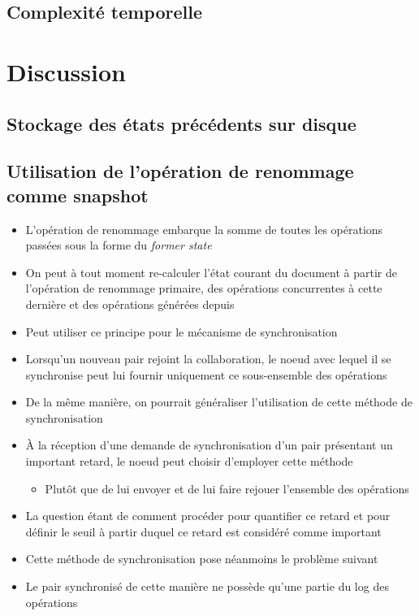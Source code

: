 \documentclass[12pt]{thesul}
\begin{document}
\subsection{Complexité temporelle}
\section{Discussion}
\subsection{Stockage des états précédents sur disque}
\subsection{Utilisation de l'opération de renommage comme snapshot}

\begin{itemize}
  \item L'opération de renommage embarque la somme de toutes les opérations passées sous la forme du \emph{former state}
  \item On peut à tout moment re-calculer l'état courant du document à partir de l'opération de renommage primaire, des opérations concurrentes à cette dernière et des opérations générées depuis
  \item Peut utiliser ce principe pour le mécanisme de synchronisation
  \item Lorsqu'un nouveau pair rejoint la collaboration, le noeud avec lequel il se synchronise peut lui fournir uniquement ce sous-ensemble des opérations
  \item De la même manière, on pourrait généraliser l'utilisation de cette méthode de synchronisation
  \item À la réception d'une demande de synchronisation d'un pair présentant un important retard, le noeud peut choisir d'employer cette méthode
  \begin{itemize}
    \item Plutôt que de lui envoyer et de lui faire rejouer l'ensemble des opérations
  \end{itemize}
  \item La question étant de comment procéder pour quantifier ce retard et pour définir le seuil à partir duquel ce retard est considéré comme important
  \item Cette méthode de synchronisation pose néanmoins le problème suivant
  \item Le pair synchronisé de cette manière ne possède qu'une partie du log des opérations

\end{itemize}
\end{document}
